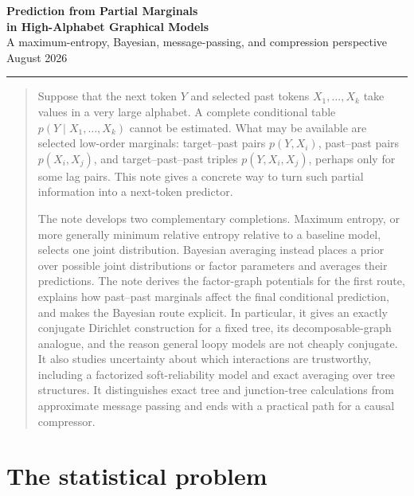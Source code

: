 \documentclass[11pt]{article}
\newcommand{\1}{\mathbf 1}
\begin{document}
\begin{center}
{\LARGE\bfseries\color{navy} Prediction from Partial Marginals\\[4pt]
in High-Alphabet Graphical Models}\\[9pt]
{\large A maximum-entropy, Bayesian, message-passing, and compression perspective}\\[8pt]
{\small August 2026}
\end{center}

\vspace{4pt}
\hrule height 0.8pt
\vspace{12pt}

\begin{abstract}
Suppose that the next token \(Y\) and selected past tokens
\(X_1,\ldots,X_k\) take values in a very large alphabet.  A complete conditional
table \(p(Y\mid X_1,\ldots,X_k)\) cannot be estimated.  What may be available are
selected low-order marginals: target--past pairs \(p(Y,X_i)\), past--past pairs
\(p(X_i,X_j)\), and target--past--past triples \(p(Y,X_i,X_j)\), perhaps only for
some lag pairs.  This note gives a concrete way to turn such partial information
into a next-token predictor.

The note develops two complementary completions.  Maximum entropy, or more
generally minimum relative entropy relative to a baseline model, selects one
joint distribution.  Bayesian averaging instead places a prior over possible
joint distributions or factor parameters and averages their predictions.  The
note derives the factor-graph potentials for the first route, explains how
past--past marginals affect the final conditional prediction, and makes the
Bayesian route explicit.  In particular, it gives an exactly conjugate
Dirichlet construction for a fixed tree, its decomposable-graph analogue, and
the reason general loopy models are not cheaply conjugate.  It also studies
uncertainty about which interactions are trustworthy, including a factorized
soft-reliability model and exact averaging over tree structures.  It
distinguishes exact tree and junction-tree calculations from approximate
message passing and ends with a practical path for a causal compressor.
\end{abstract}

\newpage
{\footnotesize\tableofcontents}
\newpage

\section{The statistical problem}
\end{document}
